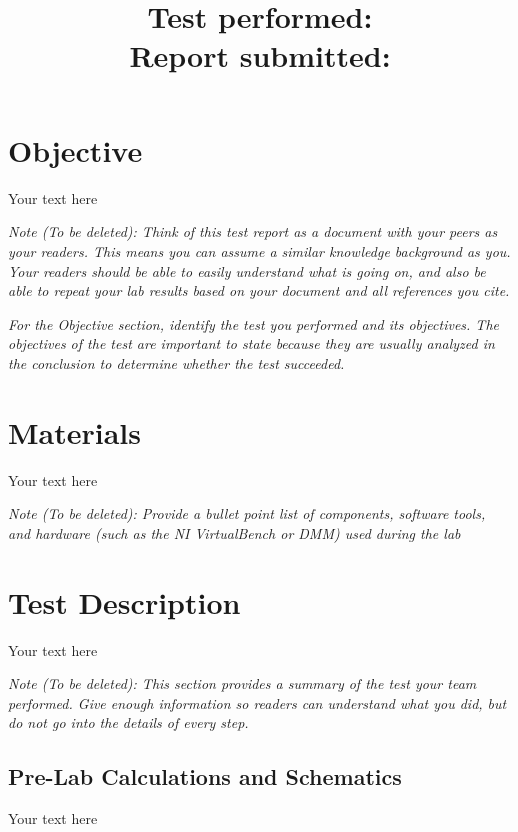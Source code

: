 \documentclass[10pt]{article}
\title{
    \textbf{\courseTitle} \\
    \textbf{\documentTitle} \\
    \bigskip
    \textbf{\large{Test performed: \testDate}} \\
    \textbf{\large{Report submitted: \reportDate}} \\
    \bigskip
    \bigskip
}
\author{\documentAuthor}
\date{}
\begin{document}
\maketitle

\newpage

\section{Objective}

Your text here

\medskip

\textit{Note (To be deleted): Think of this test report as a document with your peers as your readers. This means you can assume a similar knowledge background as you. Your readers should be able to easily understand what is going on, and also be able to repeat your lab results based on your document and all references you cite.}

\textit{For the Objective section, identify the test you performed and its objectives. The objectives of the test are important to state because they are usually analyzed in the conclusion to determine whether the test succeeded.}

\section{Materials}

Your text here

\medskip

\textit{Note (To be deleted): Provide a bullet point list of components, software tools, and hardware (such as the NI VirtualBench or DMM) used during the lab}

\section{Test Description}

Your text here

\medskip

\textit{Note (To be deleted): This section provides a summary of the test your team performed. Give enough information so readers can understand what you did, but do not go into the details of every step.}

\subsection{Pre-Lab Calculations and Schematics}

Your text here
\end{document}
